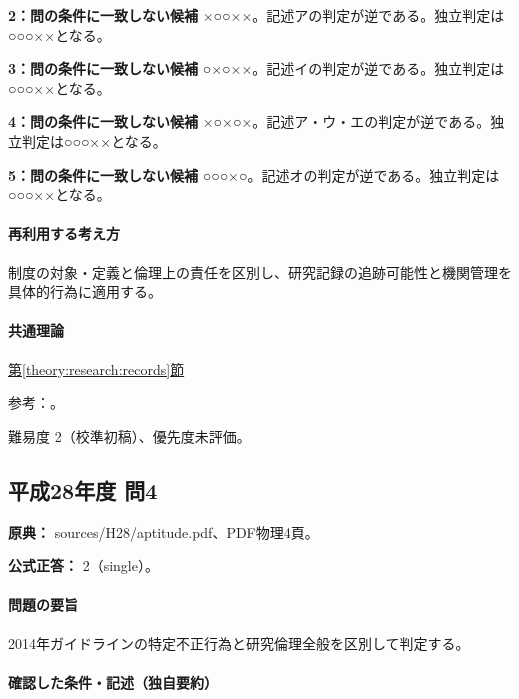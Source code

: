 \noindent\textbf{2：問の条件に一致しない候補} ×○○××。記述アの判定が逆である。独立判定は○○○××となる。\par

\noindent\textbf{3：問の条件に一致しない候補} ○×○××。記述イの判定が逆である。独立判定は○○○××となる。\par

\noindent\textbf{4：問の条件に一致しない候補} ×○×○×。記述ア・ウ・エの判定が逆である。独立判定は○○○××となる。\par

\noindent\textbf{5：問の条件に一致しない候補} ○○○×○。記述オの判定が逆である。独立判定は○○○××となる。\par

\paragraph{再利用する考え方} 制度の対象・定義と倫理上の責任を区別し、研究記録の追跡可能性と機関管理を具体的行為に適用する。

\paragraph{共通理論} \hyperref[theory:research:records]{第\ref*{theory:research:records}節}

\par 参考：\cite{mext_misconduct2014,jsps_integrity2025}。

\par 難易度 2（校準初稿）、優先度未評価。

\subsection{平成28年度 問4}
\label{q:h28-reg-apt-04}

\noindent\textbf{原典：} sources/H28/aptitude.pdf、PDF物理4頁。

\textbf{公式正答：} 2（single）。

\paragraph{問題の要旨} 2014年ガイドラインの特定不正行為と研究倫理全般を区別して判定する。

\paragraph{確認した条件・記述（独自要約）}\mbox{}\par

